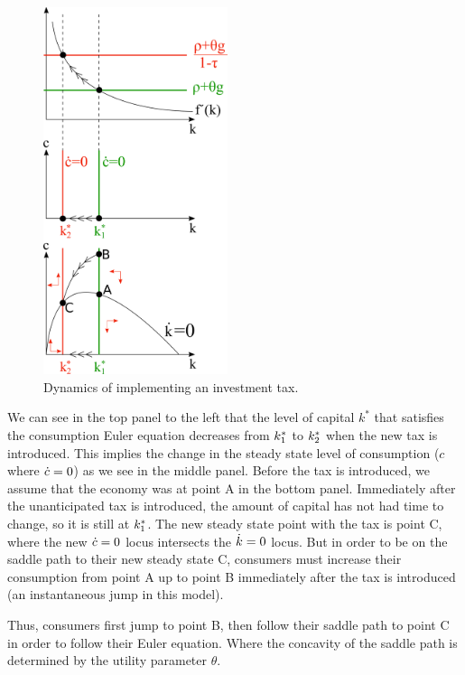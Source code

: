 \documentclass[12pt]{article}
\begin{document}
{
\begin{figure}
  \begin{center}
    \includegraphics[width=0.48\textwidth]{2.b}
  \end{center}
  \caption{Dynamics of implementing an investment tax.}
\end{figure}


\vspace{3em}

We can see in the top panel to the left that the level of capital $k^*$ that satisfies the consumption Euler equation decreases from $k^*_1$ to $k^*_2$ when the new tax is introduced. This implies the change in the steady state level of consumption ($c$ where $\dot c=0$) as we see in the middle panel. Before the tax is introduced, we assume that the economy was at point A in the bottom panel. Immediately after the unanticipated tax is introduced, the amount of capital has not had time to change, so it is still at $k^*_1$. The new steady state point with the tax is point C, where the new $\dot c=0$ locus intersects the $\dot k=0$ locus. But in order to be on the saddle path to their new steady state C, consumers must increase their consumption from point A up to point B immediately after the tax is introduced (an instantaneous jump in this model).

Thus, consumers first jump to point B, then follow their saddle path to point C in order to follow their Euler equation. Where the concavity of the saddle path is determined by the utility parameter $\theta$.

}
\end{document}
